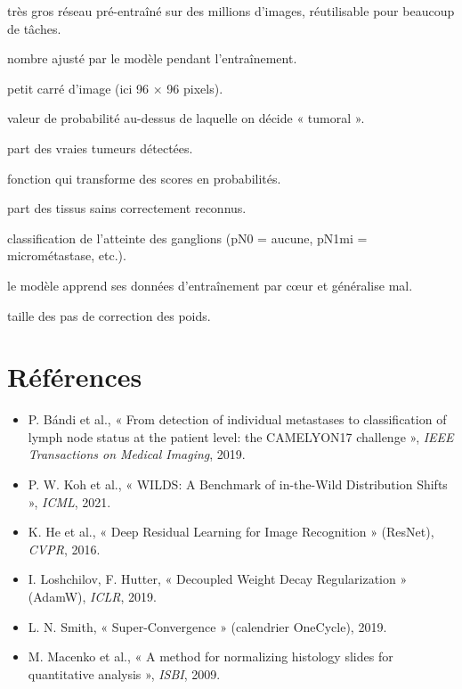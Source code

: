 \documentclass[11pt,a4paper]{article}
\begin{document}
\begin{description}[style=nextline,leftmargin=0.5cm,itemsep=1pt]
  \item[Modèle de fondation] très gros réseau pré-entraîné sur des millions d'images, réutilisable pour
        beaucoup de tâches.
  \item[Paramètre / poids] nombre ajusté par le modèle pendant l'entraînement.
  \item[Patch] petit carré d'image (ici 96 × 96 pixels).
  \item[Seuil] valeur de probabilité au-dessus de laquelle on décide « tumoral ».
  \item[Sensibilité] part des vraies tumeurs détectées.
  \item[Softmax] fonction qui transforme des scores en probabilités.
  \item[Spécificité] part des tissus sains correctement reconnus.
  \item[Stade pN] classification de l'atteinte des ganglions (pN0 = aucune, pN1mi = micrométastase, etc.).
  \item[Sur-apprentissage] le modèle apprend ses données d'entraînement par cœur et généralise mal.
  \item[Taux d'apprentissage] taille des pas de correction des poids.
\end{description}

\section*{Références}
\begin{itemize}
  \item P. Bándi et al., « From detection of individual metastases to classification of lymph node status at the
        patient level: the CAMELYON17 challenge », \emph{IEEE Transactions on Medical Imaging}, 2019.
  \item P. W. Koh et al., « WILDS: A Benchmark of in-the-Wild Distribution Shifts », \emph{ICML}, 2021.
  \item K. He et al., « Deep Residual Learning for Image Recognition » (ResNet), \emph{CVPR}, 2016.
  \item I. Loshchilov, F. Hutter, « Decoupled Weight Decay Regularization » (AdamW), \emph{ICLR}, 2019.
  \item L. N. Smith, « Super-Convergence » (calendrier OneCycle), 2019.
  \item M. Macenko et al., « A method for normalizing histology slides for quantitative analysis », \emph{ISBI}, 2009.
\end{itemize}
\end{document}
